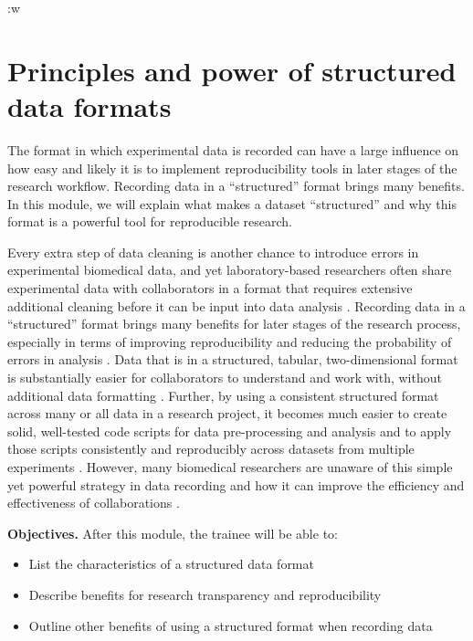 \documentclass[]{tufte-book}
\providecommand{\tightlist}{%
  \setlength{\itemsep}{0pt}\setlength{\parskip}{0pt}}
\begin{document}
:w

\hypertarget{principles-and-power-of-structured-data-formats}{%
\section{Principles and power of structured data formats}\label{principles-and-power-of-structured-data-formats}}

The format in which experimental data is recorded can have a large influence on
how easy and likely it is to implement reproducibility tools in later stages of
the research workflow. Recording data in a ``structured'' format brings many
benefits. In this module, we will explain what makes a dataset ``structured'' and
why this format is a powerful tool for reproducible research.

Every extra step of data cleaning is another chance to introduce errors in
experimental biomedical data, and yet laboratory-based researchers often share
experimental data with collaborators in a format that requires extensive
additional cleaning before it can be input into data analysis
\citep{broman2018data}. Recording data in a ``structured'' format brings many
benefits for later stages of the research process, especially in terms of
improving reproducibility and reducing the probability of errors in analysis
\citep{ellis2018share}. Data that is in a structured, tabular, two-dimensional
format is substantially easier for collaborators to understand and work with,
without additional data formatting \citep{broman2018data}. Further, by using a
consistent structured format across many or all data in a research project, it
becomes much easier to create solid, well-tested code scripts for data
pre-processing and analysis and to apply those scripts consistently and
reproducibly across datasets from multiple experiments \citep{broman2018data}.
However, many biomedical researchers are unaware of this simple yet powerful
strategy in data recording and how it can improve the efficiency and
effectiveness of collaborations \citep{ellis2018share}.

\textbf{Objectives.} After this module, the trainee will be able to:

\begin{itemize}
\tightlist
\item
  List the characteristics of a structured data format
\item
  Describe benefits for research transparency and reproducibility
\item
  Outline other benefits of using a structured format when recording data
\end{itemize}
\end{document}

